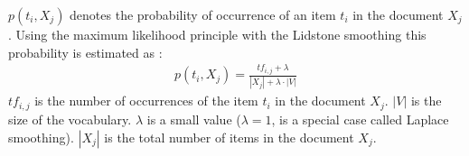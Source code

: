 \begin{definition}
  $p(t_i, X_j)$ denotes the probability of occurrence of an item $t_i$ in the document $X_j$.
  Using the maximum likelihood principle with the Lidstone smoothing this probability is estimated as :
  \begin{gather*}
    p(t_i, X_j) = \frac{tf_{i,j} + \lambda}{|X_j| + \lambda \cdot |V|}
  \end{gather*}
  $tf_{i,j}$ is the number of occurrences of the item $t_i$ in the document $X_j$.
  $|V|$ is the size of the vocabulary.
  $\lambda$ is a small value ($\lambda = 1$, is a special case called Laplace smoothing).
  $|X_j|$ is the total number of items in the document $X_j$.
\end{definition}
